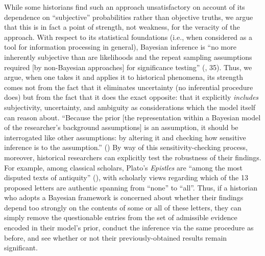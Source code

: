 \documentclass[11pt]{article}
\begin{document}
While some historians find such an approach unsatisfactory on account of its dependence on ``subjective'' probabilities rather than objective truths, we argue that this is in fact a point of strength, not weakness, for the veracity of the approach. With respect to its statistical foundations (i.e., when considered as a tool for information processing in general), Bayesian inference is ``no more inherently subjective than are likelihoods and the repeat sampling assumptions required [by non-Bayesian approaches] for significance testing'' (\cite{mcelreath_statistical_2020}, 35). Thus, we argue, when one takes it and applies it to historical phenomena, its strength comes not from the fact that it eliminates uncertainty (no inferential procedure does) but from the fact that it does the exact opposite: that it explicitly \textit{includes} subjectivity, uncertainty, and ambiguity as considerations which the model itself can reason about. ``Because the prior [the representation within a Bayesian model of the researcher's background assumptions] is an assumption, it should be interrogated like other assumptions: by altering it and checking how sensitive inference is to the assumption.'' (\cite{mcelreath_statistical_2020}) By way of this sensitivity-checking process, moreover, historical researchers can explicitly test the robustness of their findings. For example, among classical scholars, Plato's \textit{Epistles} are ``among the most disputed texts of antiquity'' (\cite{wohl_plato_1998}), with scholarly views regarding which of the 13 proposed letters are authentic spanning from ``none'' to ``all''. Thus, if a historian who adopts a Bayesian framework is concerned about whether their findings depend too strongly on the contents of some or all of these letters, they can simply remove the questionable entries from the set of admissible evidence encoded in their model's prior, conduct the inference via the same procedure as before, and see whether or not their previously-obtained results remain significant.
\end{document}
